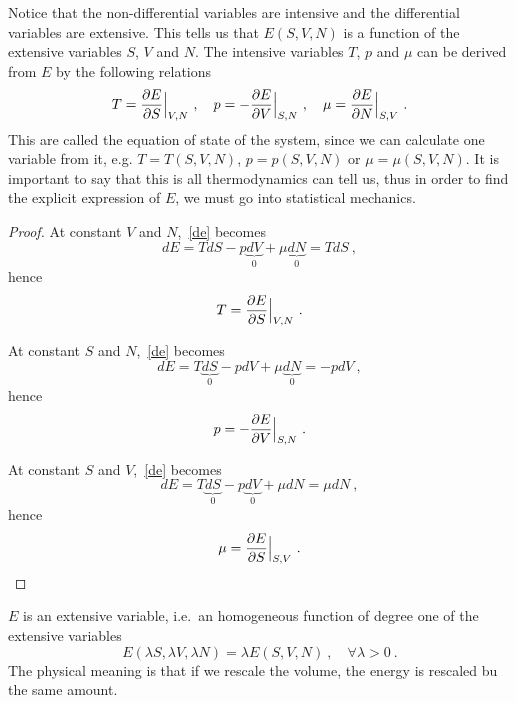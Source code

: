     Notice that the non-differential variables are intensive and the differential variables are extensive. This tells us that $E(S, V, N)$ is a function of the extensive variables $S$, $V$ and $N$. The intensive variables $T$, $p$ and $\mu$ can be derived from $E$ by the following relations 
    \begin{equation}\label{tpm}
        T = \frac{\partial E}{\partial S} \Big \vert_{V,N} ~, \quad p = - \frac{\partial E}{\partial V} \Big \vert_{S,N} ~, \quad \mu = \frac{\partial E}{\partial N} \Big \vert_{S,V} ~. 
    \end{equation}
    This are called the equation of state of the system, since we can calculate one variable from it, e.g. $T = T(S,V,N)$, $p = p(S,V,N)$ or $\mu = \mu(S,V,N)$. It is important to say that this is all thermodynamics can tell us, thus in order to find the explicit expression of $E$, we must go into statistical mechanics.
    \begin{proof}
        At constant $V$ and $N$,~\eqref{de} becomes
        \begin{equation*}
            dE = TdS - p \underbrace{dV}_0 + \mu \underbrace{dN}_0 = TdS ~,
        \end{equation*}
        hence 
        \begin{equation*}
            T = \frac{\partial E}{\partial S} \Big \vert_{V,N} ~.
        \end{equation*}

        At constant $S$ and $N$,~\eqref{de} becomes
        \begin{equation*}
            dE = T\underbrace{dS}_0 - p dV + \mu \underbrace{dN}_0 = - p dV ~,
        \end{equation*}
        hence 
        \begin{equation*}
            p = - \frac{\partial E}{\partial V} \Big \vert_{S,N} ~.
        \end{equation*}

        At constant $S$ and $V$,~\eqref{de} becomes
        \begin{equation*}
            dE = T\underbrace{dS}_0 - p \underbrace{dV}_0 + \mu dN = \mu dN ~,
        \end{equation*}
        hence 
        \begin{equation*}
            \mu = \frac{\partial E}{\partial S} \Big \vert_{S,V} ~.
        \end{equation*}
    \end{proof}

    $E$ is an extensive variable, i.e.~an homogeneous function of degree one of the extensive variables 
    \begin{equation*}
        E(\lambda S, \lambda V, \lambda N) = \lambda E(S, V, N) ~, \quad \forall \lambda > 0 ~.
    \end{equation*}
    The physical meaning is that if we rescale the volume, the energy is rescaled bu the same amount.

